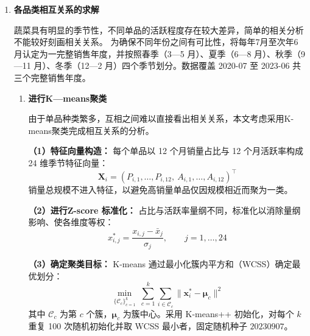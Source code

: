 \documentclass[withoutpreface,bwprint]{cumcmthesis} %
\numberwithin{equation}{section}
\begin{document}
\begin{enumerate}[leftmargin=2em,itemsep=0pt,parsep=0pt,topsep=2pt]
\hspace*{2em}\textbf{从单品层面看，}不同商品的销售规律差异更加显著。64 个单品的零销率在 1.7%

\hspace*{2em}因此，\textbf{蔬菜品类间聚合后表现较稳定，而单品层则呈现较强的季节性和个体差异。}




\item \textbf{各品类相互关系的求解}


\hspace*{2em}蔬菜具有明显的季节性，不同单品的活跃程度存在较大差异，简单的相关分析不能较好刻画相关关系。
为确保不同年份之间有可比性，将每年7月至次年6月认定为一完整销售年度，并按照春季（3—5 月）、夏季（6—8 月）、秋季（9—11 月）、冬季（12—2 月）四个季节划分。数据覆盖 2020-07 至 2023-06 共三个完整销售年度。

\begin{enumerate}

   \item \textbf{进行K—means聚类}

\hspace*{2em}由于单品种类繁多，互相之间难以直接看出相关关系，本文考虑采用K-means聚类完成相互关系的分析。

\hspace*{2em}\textbf{（1）特征向量构造：} 每个单品以 12 个月销量占比与 12 个月活跃率构成 24 维季节特征向量：
\begin{equation}
        \mathbf{X}_i = (P_{i,1},\ldots,P_{i,12},\ A_{i,1},\ldots,A_{i,12})^\top
 \end{equation}
销量总规模不进入特征，以避免高销量单品仅因规模相近而聚为一类。

\hspace*{2em}\textbf{（2）进行Z-score 标准化：} 占比与活跃率量纲不同，标准化以消除量纲影响、使各维度等权：
\begin{equation}
    x_{i,j}^{*} = \frac{x_{i,j}-\bar{x}_j}{\sigma_j},\qquad j=1,\ldots,24
\end{equation}

\hspace*{2em}\textbf{（3）确定聚类目标：} K-means 通过最小化簇内平方和（WCSS）确定最优划分：
\begin{equation}
    \min_{\{\mathcal{C}_c\}_{c=1}^{k}}\ \sum_{c=1}^{k}\sum_{i\in\mathcal{C}_c}\lVert \mathbf{x}_i^{*} - \boldsymbol{\mu}_c \rVert^2
\end{equation}
其中 $\mathcal{C}_c$ 为第 $c$ 个簇，$\boldsymbol{\mu}_c$ 为簇中心。采用 K-means++ 初始化，对每个 $k$ 重复 100 次随机初始化并取 WCSS 最小者，固定随机种子 $20230907$。


\end{enumerate}
\end{enumerate}
\end{document}
